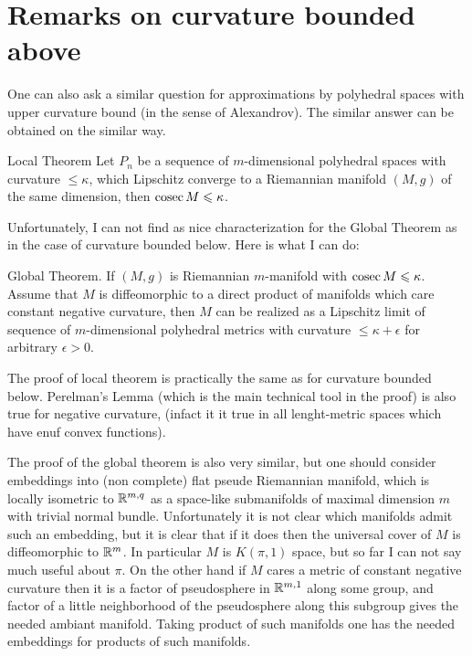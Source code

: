 \documentclass{article}
\begin{document}
\section{Remarks on curvature bounded above}




One can also ask a similar question for approximations by polyhedral spaces 
with upper curvature bound (in the sense of Alexandrov). The similar answer can be obtained on the similar way.


\begin{thm}{Local Theorem} Let $P_n$ be a sequence of $m$-dimensional
polyhedral spaces
with curvature $\le \kappa$, which Lipschitz converge to a
Riemannian manifold $(M,g)$ of the same dimension, then $\mathop{\rm cosec}\nolimits M\leqslant \kappa$.
\end{thm}

Unfortunately, I can not find as nice characterization for the Global Theorem
as in the case of curvature bounded below. Here is what I can do:


\begin{thm}{Global Theorem.}
 If $(M,g)$ is Riemannian $m$-manifold with $\mathop{\rm cosec}\nolimits M\leqslant \kappa$.
Assume that $M$ 
is diffeomorphic to a direct product of manifolds which care constant 
negative curvature, then $M$ can be realized as a Lipschitz limit
of sequence of $m$-dimensional polyhedral metrics with curvature
$\le \kappa+\epsilon$ for arbitrary $\epsilon>0$.
\end{thm}

The proof of local theorem is practically the same as for curvature bounded 
below. Perelman's Lemma (which is the main technical tool in the proof) is 
also true for negative curvature, 
(infact it it true in all lenght-metric spaces which have 
enuf convex functions).

The proof of the global theorem is also very similar, but one should consider 
embeddings into (non complete) flat pseude Riemannian manifold, which is locally isometric to $\mathbb{R}^{m,q}$  as a space-like submanifolds of maximal dimension $m$ with trivial normal bundle.
 Unfortunately it is not clear which manifolds admit such an embedding, but it is clear that if it does then the universal cover of $M$ is diffeomorphic to $\mathbb{R}^m$. 
In particular $M$ is $K(\pi,1)$ space, but so far I can not say much useful 
about $\pi$. On the other hand if $M$ cares a metric of constant negative curvature then it is a factor of pseudosphere in $\mathbb{R}^{m,1}$ along some group,
and factor of a little neighborhood of the pseudosphere along this subgroup gives the needed ambiant manifold. Taking product of such manifolds one has the needed embeddings for products of such manifolds.
\end{document}

